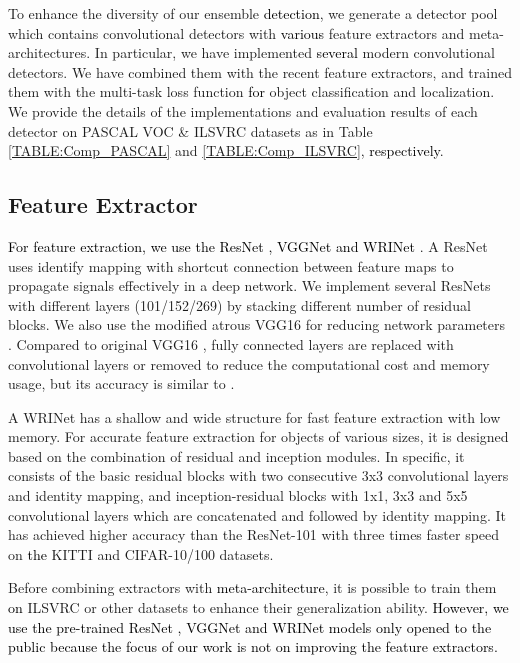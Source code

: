 \documentclass[10pt,twocolumn,letterpaper]{article}
\newcommand{\RE}{\textcolor{black}}
\newcommand{\RV}{\textcolor{black}}
\begin{document}
To enhance the diversity of our ensemble \RV{detection}, we generate a detector pool which contains convolutional detectors with \RV{various} feature extractors and meta-architectures. In particular, we have implemented \RV{several} modern convolutional detectors. We have combined them with the recent feature extractors, and trained them with the multi-task loss function \cite{Girshick15_ICCV15} \RV{for} object classification and localization. We provide the details of the implementations and evaluation results of each detector on PASCAL VOC \& ILSVRC datasets as  in Table \ref{TABLE:Comp_PASCAL} and \ref{TABLE:Comp_ILSVRC}, \RV{respectively}. 




\subsection{Feature Extractor}
\RE{For feature extraction, we use the ResNet \cite{HeZRS_ECCV16}, VGGNet \cite{SimonyanZ14a} and WRINet \cite{LeeKPCK_Corr17}}. A ResNet  uses identify mapping with shortcut connection between feature maps  to propagate signals effectively in a deep network.  We implement several ResNets with different layers (101/152/269) by stacking different number of residual blocks. We also use the modified atrous VGG16 for reducing network parameters  \cite{LiuAESRFB_ECCV16}. Compared to original VGG16 \cite{SimonyanZ14a},  fully connected layers are replaced with convolutional layers or removed to reduce the computational cost and memory usage, but its accuracy is similar to \cite{SimonyanZ14a}. 

A WRINet \cite{LeeKPCK_Corr17} has a shallow and wide structure for fast  feature extraction with low memory. For accurate feature extraction for objects of various sizes, it is designed based on the combination of residual \cite{HeZRS_ECCV16} and inception \cite{CVPR15_Inception} modules. In specific, it consists of the basic residual blocks with two consecutive 3x3 convolutional layers and identity mapping, and inception-residual blocks with 1x1, 3x3 and 5x5 convolutional layers which are concatenated and followed by identity mapping. It has achieved higher accuracy  than the ResNet-101 with three times faster speed on \RV{the} KITTI and CIFAR-10/100 datasets.




Before combining extractors with \RV{meta-architecture}, it is possible to train them \RE{on} ILSVRC \cite{ILSVRC15} or other datasets to enhance their generalization ability. \RV{However, we use the pre-trained  ResNet \cite{ZengOYLXWLZYWZW_CORR16, tensorflow2015}, VGGNet \cite{LiuAESRFB_ECCV16} and WRINet \cite{LeeKPCK_Corr17} models only opened to the public because the focus of our work is not on improving the feature extractors.}
 
\end{document}
